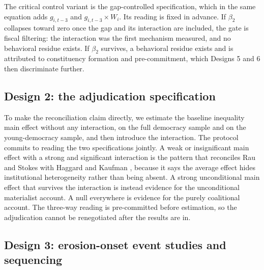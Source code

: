 The critical control variant is the gap-controlled specification, which in the same equation adds $g_{i,t-3}$ and $g_{i,t-3} \times W_i$. Its reading is fixed in advance. If $\beta_2$ collapses toward zero once the gap and its interaction are included, the gate is fiscal filtering: the interaction was the first mechanism measured, and no behavioral residue exists. If $\beta_2$ survives, a behavioral residue exists and is attributed to constituency formation and pre-commitment, which Designs 5 and 6 then discriminate further.

\subsection{Design 2: the adjudication specification}

To make the reconciliation claim directly, we estimate the baseline inequality main effect without any interaction, on the full democracy sample and on the young-democracy sample, and then introduce the interaction. The protocol commits to reading the two specifications jointly. A weak or insignificant main effect with a strong and significant interaction is the pattern that reconciles Rau and Stokes with Haggard and Kaufman \citep{RauStokes2025, HaggardKaufman2021}, because it says the average effect hides institutional heterogeneity rather than being absent. A strong unconditional main effect that survives the interaction is instead evidence for the unconditional materialist account. A null everywhere is evidence for the purely coalitional account. The three-way reading is pre-committed before estimation, so the adjudication cannot be renegotiated after the results are in.

\subsection{Design 3: erosion-onset event studies and sequencing}

